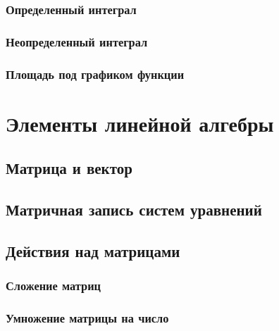 \documentclass[
  letterpaper,
  DIV=11,
  numbers=noendperiod]{scrreprt}
\theoremstyle{definition}
\theoremstyle{remark}
\begin{document}
\subsection{Определенный
интеграл}\label{math-analysis-integral-definite}

\subsection{Неопределенный
интеграл}\label{math-analysis-integral-indefinite}

\subsection{Площадь под графиком
функции}\label{math-analysis-integral-auc}


\chapter{Элементы линейной алгебры}\label{math-linal}

\section{Матрица и
вектор}\label{ux43cux430ux442ux440ux438ux446ux430-ux438-ux432ux435ux43aux442ux43eux440}

\section{Матричная запись систем
уравнений}\label{ux43cux430ux442ux440ux438ux447ux43dux430ux44f-ux437ux430ux43fux438ux441ux44c-ux441ux438ux441ux442ux435ux43c-ux443ux440ux430ux432ux43dux435ux43dux438ux439}

\section{Действия над
матрицами}\label{ux434ux435ux439ux441ux442ux432ux438ux44f-ux43dux430ux434-ux43cux430ux442ux440ux438ux446ux430ux43cux438}

\subsection{Сложение
матриц}\label{ux441ux43bux43eux436ux435ux43dux438ux435-ux43cux430ux442ux440ux438ux446}

\subsection{Умножение матрицы на
число}\label{ux443ux43cux43dux43eux436ux435ux43dux438ux435-ux43cux430ux442ux440ux438ux446ux44b-ux43dux430-ux447ux438ux441ux43bux43e}
\end{document}
